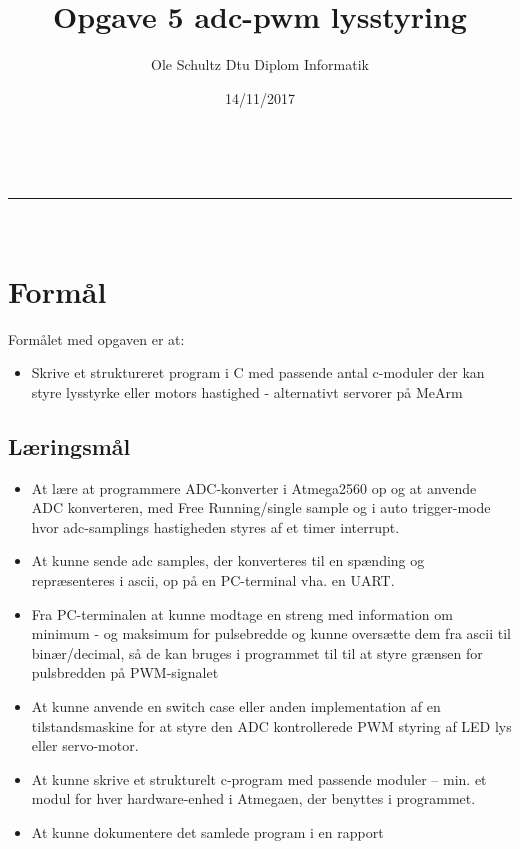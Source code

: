 \documentclass[a4paper,11pt]{article}
\makeatletter
\newcommand{\linia}{\rule{\linewidth}{0.5pt}}
\theoremstyle{mytheor}
\renewcommand{\maketitle}{
\begin{center}
\vspace{1ex}
{\huge \textsc{\@title}}
\vspace{1ex}
\\
\linia\\
\@author \hfill \@date
\vspace{3ex}
\end{center}
}
\makeatother
\begin{document}
\title{Opgave 5 adc-pwm lysstyring}

\author{Ole Schultz Dtu Diplom Informatik}

\date{14/11/2017}

\maketitle

\section{Formål}
Formålet med opgaven er at:
\begin{itemize}
 \item Skrive et struktureret program i C med passende antal c-moduler der kan styre lysstyrke eller motors hastighed - alternativt servorer på MeArm
\end{itemize}

\subsection{Læringsmål}
\begin{itemize}
\item At lære at programmere ADC-konverter i Atmega2560 op og at anvende ADC konverteren, med Free Running/single sample og i auto trigger-mode hvor adc-samplings hastigheden styres af et timer interrupt.
\item  At kunne sende adc samples, der konverteres til en spænding og repræsenteres i ascii, op på en PC-terminal vha. en UART.
\item Fra PC-terminalen at kunne modtage en streng med information om minimum - og maksimum for pulsebredde og kunne oversætte dem fra ascii til binær/decimal, så de kan bruges i programmet til til at styre grænsen for pulsbredden på PWM-signalet
\item At kunne anvende en switch case eller anden implementation af en tilstandsmaskine for at styre den ADC kontrollerede PWM styring af LED lys eller servo-motor.
\item At kunne skrive et strukturelt c-program med passende moduler – min. et modul for hver hardware-enhed i Atmegaen, der benyttes i programmet.
\item At kunne dokumentere det samlede program i en rapport
\end{itemize}
\end{document}
